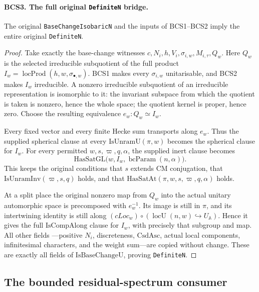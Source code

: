 \documentclass[11pt,a4paper]{article}
\numberwithin{equation}{section}
\theoremstyle{remark}\newtheorem{remark}[theorem]{Remark}
\begin{document}
\paragraph{BCS3. The full original \texttt{Definite\allowbreak N} bridge.}
\label{claim:BCS3}
The original \texttt{Base\allowbreak Change\allowbreak Isobaric\allowbreak N} and the inputs of BCS1--BCS2
imply the entire original \texttt{Definite\allowbreak N}.
\begin{proof}
Take exactly the base-change witnesses
\(c,N_i,h,V_i,\sigma_{i,w},M_{i,\tau},Q_w\).
Here \(Q_w\) is the selected irreducible subquotient of the full
product \(I_w=\operatorname{locProd}(h,w,\sigma_{\bullet,w})\).
BCS1 makes every \(\sigma_{i,w}\) unitarisable, and BCS2 makes
\(I_w\) irreducible.  A nonzero irreducible subquotient of an
irreducible representation is isomorphic to it: the invariant
subspace from which the quotient is taken is nonzero, hence the
whole space; the quotient kernel is proper, hence zero.
Choose the resulting equivalence \(e_w:Q_w\simeq I_w\).

Every fixed vector and every finite Hecke sum transports along
\(e_w\).  Thus the supplied spherical clause at every
\(\mathrm{IsUnramU}(\pi,w)\) becomes the spherical clause for
\(I_w\).  For every permitted \(w,s,\varpi,q,\alpha\), the
supplied inert clause becomes
\[
 \mathrm{HasSatGL}\bigl(w,I_w,\operatorname{bcParam}(n,\alpha)\bigr).
 \tag{BCS.6}
\]
This keeps the original conditions that \(s\) extends CM conjugation,
that \(\mathrm{IsUnramInv}(\varpi,s,q)\) holds, and that
\(\mathrm{HasSatAt}(\pi,w,s,\varpi,q,\alpha)\) holds.

At a split place the original nonzero map from \(Q_w\) into the
actual unitary automorphic space is precomposed with \(e_w^{-1}\).
Its image is still in \(\pi\), and its intertwining identity is
still along
\((cLoc_w)\circ(\operatorname{locU}(n,w)\hookrightarrow U_{\mathbb A})\).
Hence it gives the full \(\mathrm{IsCompAlong}\) clause for
\(I_w\), with precisely that subgroup and map.  All other fields
---positive \(N_i\), discreteness, \(\mathrm{CsdAsc}\), actual
local components, infinitesimal characters, and the weight sum---are
copied without change.  These are exactly all fields of
\(\mathrm{IsBaseChangeU}\), proving \texttt{Definite\allowbreak N}.
\end{proof}

\subsection{The bounded residual-spectrum consumer}
\end{document}
